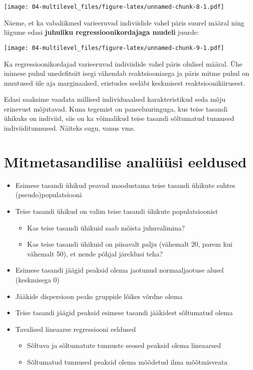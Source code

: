 \documentclass[
]{book}
\providecommand{\tightlist}{%
  \setlength{\itemsep}{0pt}\setlength{\parskip}{0pt}}
\begin{document}
\texttt{[image: 04-multilevel\_files/figure-latex/unnamed-chunk-8-1.pdf]}

Näeme, et ka vabaliikmed varieeruvad indiviidide vahel päris suurel määral ning liigume edasi \textbf{juhuliku regressioonikordajaga mudeli} juurde:

\texttt{[image: 04-multilevel\_files/figure-latex/unnamed-chunk-9-1.pdf]}

Ka regressioonikordajad varieeruvad indiviidide vahel päris olulisel määral. Ühe inimese puhul unedefitsiit isegi vähendab reaktsiooniaega ja päris mitme puhul on muutused üle aja marginaalsed, eristudes seeläbi keskmisest reaktsioonikiirusest.

Edasi saaksime vaadata millised individuaalsed karakteristikud seda mõju erinevust mõjutavad. Kuna tegemist on paneeluuringuga, kus teise tasandi ühikuks on indiviid, siis on ka võimalikud teise tasandi sõltumatud tunnused indiviiditunnused. Näiteks sugu, vanus vms.

\hypertarget{mitmetasandilise-analuxfcuxfcsi-eeldused}{%
\section{Mitmetasandilise analüüsi eeldused}\label{mitmetasandilise-analuxfcuxfcsi-eeldused}}

\begin{itemize}
\tightlist
\item
  Esimese tasandi ühikud peavad moodustama teise tasandi ühikute suhtes (pseudo)populatsiooni\\
\item
  Teise tasandi ühikud on valim teise tasandi ühikute populatsioonist

  \begin{itemize}
  \tightlist
  \item
    Kas teise tasandi ühikuid saab mõista juhuvalimina?
  \item
    Kas teise tasandi ühikuid on piisavalt palju (vähemalt 20, parem kui vähemalt 50), et nende põhjal järeldusi teha?
  \end{itemize}
\item
  Esimese tasandi jäägid peaksid olema jaotunud normaaljaotuse alusel (keskmisega 0)
\item
  Jääkide dispersioon peaks gruppide lõikes võrdne olema
\item
  Teise tasandi jäägid peaksid esimese tasandi jääkidest sõltumatud olema
\item
  Tavalised lineaarse regressiooni eeldused

  \begin{itemize}
  \tightlist
  \item
    Sõltuva ja sõltumatute tunnuste seosed peaksid olema lineaarsed
  \item
    Sõltumatud tunnused peaksid olema mõõdetud ilma mõõtmisveata
  \end{itemize}
\end{itemize}
\end{document}
